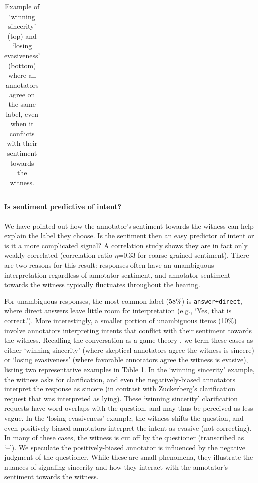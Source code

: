 \begin{table}[t]
\begin{tabular}{>{\raggedright\arraybackslash}p{5cm} >{\raggedright\arraybackslash}p{2.5cm} p{1.5cm} p{1cm}}
    \bottomrule
    \end{tabular}
    \vspace{-.4em}
    \caption{Example of `winning sincerity' (top) and `losing evasiveness' (bottom) where all annotators agree on the same label, even when it conflicts with their sentiment towards the witness.}
    \label{tab:subj_unambig_example}
\end{table}

\paragraph{Is sentiment predictive of intent?} We have pointed out how the annotator's sentiment towards the witness can help explain the label they choose. Is the sentiment then an easy predictor of intent or is it a more complicated signal? A correlation study shows they are in fact only weakly correlated (correlation ratio $\eta$=0.33 for coarse-grained sentiment).
There are two reasons for this result: responses  often have an unambiguous interpretation regardless of annotator sentiment, and annotator sentiment towards the witness typically fluctuates throughout the hearing.


For unambiguous responses, the most common label (58\%) is \texttt{answer+direct}, where direct answers leave little room for interpretation (e.g., `Yes, that is correct.'). More interestingly, a smaller portion of unambiguous items (10\%) involve annotators interpreting intents that conflict with their sentiment towards the witness. Recalling the conversation-as-a-game theory \cite{Asher:2003}, we term these cases as either `winning sincerity' (where skeptical annotators agree the witness is sincere) or `losing evasiveness' (where favorable annotators agree the witness is evasive), listing two representative examples in Table \ref{tab:subj_unambig_example}. In the `winning sincerity' example, the witness asks for clarification, and even the negatively-biased annotators interpret the response as sincere (in contrast with Zuckerberg's clarification request that was interpreted as lying). These `winning sincerity' clarification requests have word overlaps with the question, and may thus be perceived as less vague. In the `losing evasiveness' example, the witness shifts the question, and even positively-biased annotators interpret the intent as evasive (not correcting). In many of these cases, the witness is cut off by the questioner (transcribed as `--'). We speculate the positively-biased annotator is influenced by the negative judgment of the questioner. While these are small phenomena, they illustrate the nuances of signaling sincerity and how they interact with the annotator's sentiment towards the witness.

